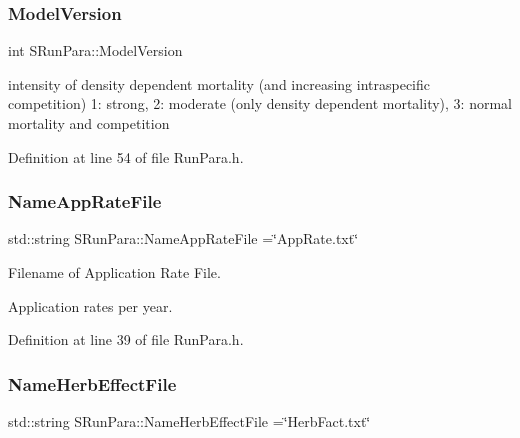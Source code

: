 \mbox{\label{struct_s_run_para_a7a2de3ca3c66de322585506a367a4aa3}} 
\subsubsection{\texorpdfstring{ModelVersion}{ModelVersion}}
{\footnotesize\ttfamily int S\+Run\+Para\+::\+Model\+Version}

intensity of density dependent mortality (and increasing intraspecific competition) 1\+: strong, 2\+: moderate (only density dependent mortality), 3\+: normal mortality and competition 

Definition at line 54 of file Run\+Para.\+h.

\mbox{\label{struct_s_run_para_af084c204866b0f3137a70730bebe7e4a}} 
\subsubsection{\texorpdfstring{NameAppRateFile}{NameAppRateFile}}
{\footnotesize\ttfamily std\+::string S\+Run\+Para\+::\+Name\+App\+Rate\+File =\char`\"{}App\+Rate.\+txt\char`\"{}\hspace{0.3cm}{\ttfamily [static]}}



Filename of Application Rate File. 

Application rates per year. 

Definition at line 39 of file Run\+Para.\+h.

\mbox{\label{struct_s_run_para_a185a1dfe4962cec31af4b3328d12c8e8}} 
\subsubsection{\texorpdfstring{NameHerbEffectFile}{NameHerbEffectFile}}
{\footnotesize\ttfamily std\+::string S\+Run\+Para\+::\+Name\+Herb\+Effect\+File =\char`\"{}Herb\+Fact.\+txt\char`\"{}\hspace{0.3cm}{\ttfamily [static]}}



